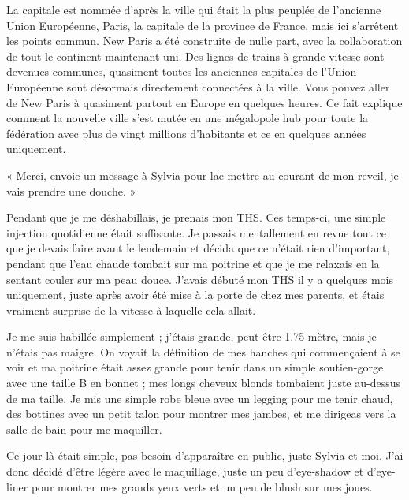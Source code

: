 \documentclass[12pt,colorlinks,a4paper]{book}
\begin{document}
\bigskip

La capitale est nommée d'après la ville qui était la plus peuplée
de l'ancienne Union Européenne, Paris, la capitale de la province
de France, mais ici s'arrêtent les points commun. New Paris a été
construite de nulle part, avec la collaboration de tout le continent
maintenant uni. Des lignes de trains à grande vitesse sont devenues
communes, quasiment toutes les anciennes capitales de l'Union Européenne
sont désormais directement connectées à la ville. Vous pouvez aller
de New Paris à quasiment partout en Europe en quelques heures. Ce
fait explique comment la nouvelle ville s'est mutée en une mégalopole
hub pour toute la fédération avec plus de vingt millions d'habitants
et ce en quelques années uniquement.\par

\bigskip

« Merci, envoie un message à Sylvia pour lae mettre au courant de
mon reveil, je vais prendre une douche. »\par

\bigskip
Pendant que je me déshabillais, je prenais mon THS. Ces temps-ci,
une simple injection quotidienne était suffisante. Je passais mentallement
en revue tout ce que je devais faire avant le lendemain et décida
que ce n'était rien d'important, pendant que l'eau chaude tombait
sur ma poitrine et que je me relaxais en la sentant couler sur ma
peau douce. J'avais débuté mon THS il y a quelques mois uniquement,
juste après avoir été mise à la porte de chez mes parents, et étais
vraiment surprise de la vitesse à laquelle cela allait.\par 

\bigskip

Je me suis habillée simplement ; j'étais grande, peut-être 1.75 mètre,
mais je n'étais pas maigre. On voyait la définition de mes hanches
qui commençaient à se voir et ma poitrine était assez grande pour
tenir dans un simple soutien-gorge avec une taille B en bonnet ; mes
longs cheveux blonds tombaient juste au-dessus de ma taille. Je mis
une simple robe bleue avec un legging pour me tenir chaud, des bottines
avec un petit talon pour montrer mes jambes, et me dirigeas vers la
salle de bain pour me maquiller.\par

\bigskip

Ce jour-là était simple, pas besoin d'apparaître en public, juste
Sylvia et moi. J'ai donc décidé d'être légère avec le maquillage,
juste un peu d'eye-shadow et d'eye-liner pour montrer mes grands yeux
verts et un peu de blush sur mes joues.\par
\end{document}
